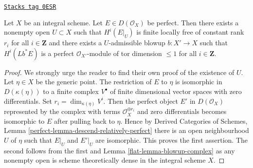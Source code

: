 \begin{lemma}
\label{flat-lemma-blowup-complex-integral}
\href{https://stacks.math.columbia.edu/tag/0ESR}{\texttt{Stacks tag 0ESR}}

Let $X$ be an integral scheme. Let $E \in D(\mathcal{O}_X)$ be perfect.
Then there exists a nonempty open $U \subset X$
such that $H^i(E|_U)$ is finite locally free of constant rank $r_i$
for all $i \in \mathbf{Z}$ and there exists a $U$-admissible blowup
$b : X' \to X$ such that $H^i(Lb^*E)$ is a perfect
$\mathcal{O}_{X'}$-module of tor dimension $\leq 1$ for all $i \in \mathbf{Z}$.
\end{lemma}

\begin{proof}

We strongly urge the reader to find their own proof of the
existence of $U$. Let $\eta \in X$ be the generic point.
The restriction of $E$ to $\eta$ is isomorphic in $D(\kappa(\eta))$ to a
finite complex $V^\bullet$ of finite dimensional vector spaces with zero
differentials. Set $r_i = \dim_{\kappa(\eta)} V^i$.
Then the perfect object $E'$ in $D(\mathcal{O}_X)$ represented by the complex
with terms $\mathcal{O}_X^{\oplus r_i}$ and zero differentials
becomes isomorphic to $E$ after pulling back to $\eta$.
Hence by Derived Categories of Schemes, Lemma
\ref{perfect-lemma-descend-relatively-perfect}
there is an open neighbourhood $U$ of $\eta$ such that $E|_U$ and $E'|_U$
are isomorphic. This proves the first assertion. The second follows from the
first and Lemma \ref{flat-lemma-blowup-complex} as any nonempty open is
scheme theoretically dense in the integral scheme $X$.
\end{proof}

